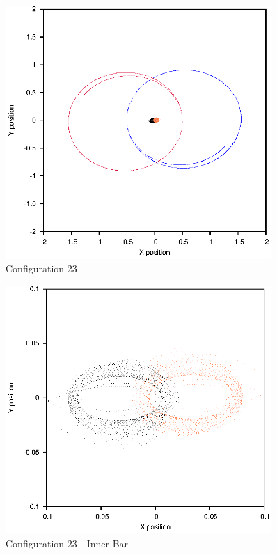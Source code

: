 \documentclass[a4paper,12pt]{article}
\begin{document}
\begin{figure}[H]
\centering
\includegraphics[width=0.9\textwidth]{./2017results/1-1-1-04/Orbit.eps}
\caption{Configuration 23}
\label{fig:config23}
\end{figure}
\begin{figure}[H]
\centering
\includegraphics[width=0.9\textwidth]{./2017results/1-1-1-04/Inner.eps}
\caption{Configuration 23 - Inner Bar}
\label{fig:config23i}
\end{figure}
\end{document}
